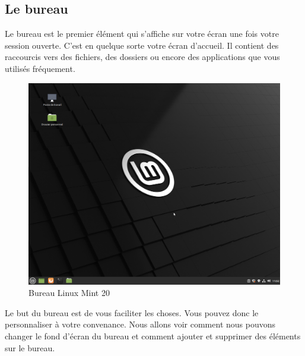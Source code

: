 \documentclass[12pt]{book}
\begin{document}
	\subsection{Le bureau}\label{sec:bureau}
		Le bureau est le premier élément qui s'affiche sur votre écran une fois votre session ouverte.
		C'est en quelque sorte votre écran d'accueil.
		Il contient des raccourcis vers des fichiers, des dossiers ou encore des applications que vous utilisés fréquement.
		\begin{figure}[h]
			\centering
			\includegraphics[width=\textwidth]{include/bureau.png}
			\caption{Bureau Linux Mint 20}
			\label{fig:bureau}
		\end{figure}\par
		Le but du bureau est de vous faciliter les choses.
		Vous pouvez donc le personnaliser à votre convenance.
		Nous allons voir comment nous pouvons changer le fond d'écran du bureau et comment ajouter et supprimer des éléments sur le bureau.
\end{document}
